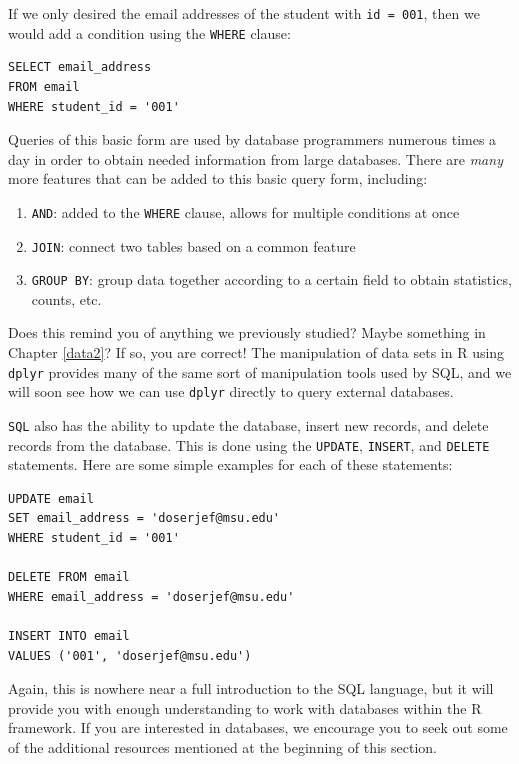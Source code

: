 \documentclass[
]{krantz}
\providecommand{\tightlist}{%
  \setlength{\itemsep}{0pt}\setlength{\parskip}{0pt}}
\begin{document}
If we only desired the email addresses of the student with \texttt{id\ =\ 001}, then we would add a condition using the \texttt{WHERE} clause:

\begin{verbatim}
SELECT email_address
FROM email
WHERE student_id = '001'
\end{verbatim}

Queries of this basic form are used by database programmers numerous times a day in order to obtain needed information from large databases. There are \emph{many} more features that can be added to this basic query form, including:

\begin{enumerate}
\def\labelenumi{\arabic{enumi}.}
\tightlist
\item
  \texttt{AND}: added to the \texttt{WHERE} clause, allows for multiple conditions at once
\item
  \texttt{JOIN}: connect two tables based on a common feature
\item
  \texttt{GROUP\ BY}: group data together according to a certain field to obtain statistics, counts, etc.
\end{enumerate}

Does this remind you of anything we previously studied? Maybe something in Chapter \ref{data2}? If so, you are correct! The manipulation of data sets in R using \texttt{dplyr} provides many of the same sort of manipulation tools used by SQL, and we will soon see how we can use \texttt{dplyr} directly to query external databases.

\texttt{SQL} also has the ability to update the database, insert new records, and delete records from the database. This is done using the \texttt{UPDATE}, \texttt{INSERT}, and \texttt{DELETE} statements. Here are some simple examples for each of these statements:

\begin{verbatim}
UPDATE email
SET email_address = 'doserjef@msu.edu'
WHERE student_id = '001'

DELETE FROM email
WHERE email_address = 'doserjef@msu.edu'

INSERT INTO email
VALUES ('001', 'doserjef@msu.edu')
\end{verbatim}

Again, this is nowhere near a full introduction to the SQL language, but it will provide you with enough understanding to work with databases within the R framework. If you are interested in databases, we encourage you to seek out some of the additional resources mentioned at the beginning of this section.
\end{document}
